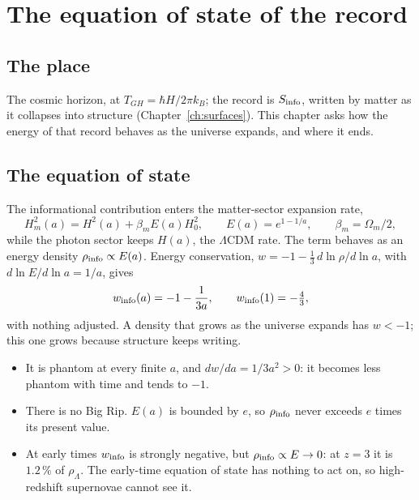 \chapter{The equation of state of the record}\label{ch:darkenergy}

\section*{The place}
The cosmic horizon, at $T_{GH}=\hbar H/2\pi k_B$; the record is $S_{\rm info}$, written by matter as it collapses into structure
(Chapter~\ref{ch:surfaces}). This chapter asks how the energy of that record behaves as the universe expands, and where it ends.

\section{The equation of state}
The informational contribution enters the matter-sector expansion rate,
\begin{equation}H_m^2(a)=H^2(a)+\beta_mE(a)H_0^2,\qquad E(a)=e^{1-1/a},\qquad\beta_m=\Omega_m/2,\label{eq:Hm}\end{equation}
while the photon sector keeps $H(a)$, the $\Lambda$CDM rate. The term behaves as an energy density $\rho_{\rm info}\propto E(a)$. Energy conservation,
$w=-1-\tfrac13\,d\ln\rho/d\ln a$, with $d\ln E/d\ln a=1/a$, gives
\begin{equation}w_{\rm info}(a)=-1-\frac{1}{3a},\qquad w_{\rm info}(1)=-\tfrac43,\end{equation}
with nothing adjusted. A density that grows as the universe expands has $w<-1$; this one grows because structure keeps writing.
\begin{itemize}
\item It is phantom at every finite $a$, and $dw/da=1/3a^2>0$: it becomes less phantom with time and tends to $-1$.
\item There is no Big Rip. $E(a)$ is bounded by $e$, so $\rho_{\rm info}$ never exceeds $e$ times its present value.
\item At early times $w_{\rm info}$ is strongly negative, but $\rho_{\rm info}\propto E\to0$: at $z=3$ it is $1.2\,\%$ of $\rho_\Lambda$. The
early-time equation of state has nothing to act on, so high-redshift supernovae cannot see it.
\end{itemize}

